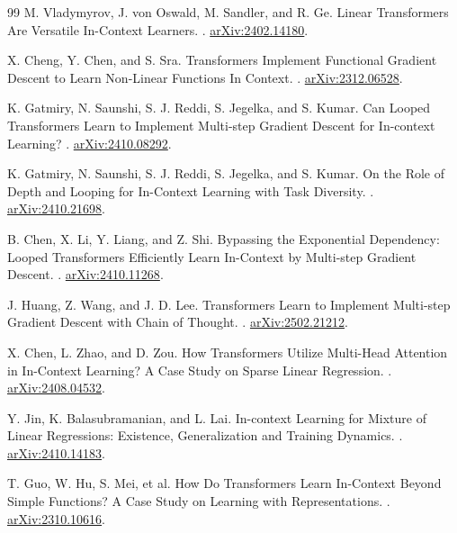 \documentclass[11pt,a4paper]{article}
\begin{document}
\begin{thebibliography}{99}
M. Vladymyrov, J. von Oswald, M. Sandler, and R. Ge.
\newblock Linear Transformers Are Versatile In-Context Learners.
. \href{https://arxiv.org/abs/2402.14180}{arXiv:2402.14180}.

X. Cheng, Y. Chen, and S. Sra.
\newblock Transformers Implement Functional Gradient Descent to Learn Non-Linear Functions In Context.
. \href{https://arxiv.org/abs/2312.06528}{arXiv:2312.06528}.

K. Gatmiry, N. Saunshi, S. J. Reddi, S. Jegelka, and S. Kumar.
\newblock Can Looped Transformers Learn to Implement Multi-step Gradient Descent for In-context Learning?
. \href{https://arxiv.org/abs/2410.08292}{arXiv:2410.08292}.

K. Gatmiry, N. Saunshi, S. J. Reddi, S. Jegelka, and S. Kumar.
\newblock On the Role of Depth and Looping for In-Context Learning with Task Diversity.
. \href{https://arxiv.org/abs/2410.21698}{arXiv:2410.21698}.

B. Chen, X. Li, Y. Liang, and Z. Shi.
\newblock Bypassing the Exponential Dependency: Looped Transformers Efficiently Learn In-Context by Multi-step Gradient Descent.
. \href{https://arxiv.org/abs/2410.11268}{arXiv:2410.11268}.

J. Huang, Z. Wang, and J. D. Lee.
\newblock Transformers Learn to Implement Multi-step Gradient Descent with Chain of Thought.
. \href{https://arxiv.org/abs/2502.21212}{arXiv:2502.21212}.

X. Chen, L. Zhao, and D. Zou.
\newblock How Transformers Utilize Multi-Head Attention in In-Context Learning? A Case Study on Sparse Linear Regression.
. \href{https://arxiv.org/abs/2408.04532}{arXiv:2408.04532}.

Y. Jin, K. Balasubramanian, and L. Lai.
\newblock In-context Learning for Mixture of Linear Regressions: Existence, Generalization and Training Dynamics.
. \href{https://arxiv.org/abs/2410.14183}{arXiv:2410.14183}.

T. Guo, W. Hu, S. Mei, et al.
\newblock How Do Transformers Learn In-Context Beyond Simple Functions? A Case Study on Learning with Representations.
. \href{https://arxiv.org/abs/2310.10616}{arXiv:2310.10616}.


\end{thebibliography}
\end{document}
